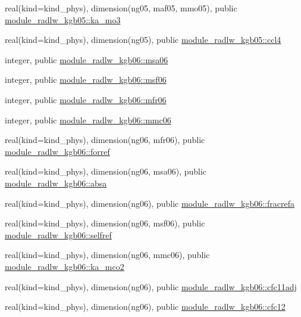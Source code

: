 \begin{DoxyCompactItemize}
\item 
real(kind=kind\+\_\+phys), dimension(ng05, maf05, mmo05), public \hyperlink{namespacemodule__radlw__kgb05_a6021fc2f60379615b7882a28e1caa1e9}{module\+\_\+radlw\+\_\+kgb05\+::ka\+\_\+mo3}
\item 
real(kind=kind\+\_\+phys), dimension(ng05), public \hyperlink{namespacemodule__radlw__kgb05_a15c6b3bfa9d8cbf20099dd4f364444b5}{module\+\_\+radlw\+\_\+kgb05\+::ccl4}
\item 
integer, public \hyperlink{namespacemodule__radlw__kgb06_add7b5d0d3ea44e1e677948c33e870333}{module\+\_\+radlw\+\_\+kgb06\+::msa06}
\item 
integer, public \hyperlink{namespacemodule__radlw__kgb06_a65f808aeb87457d383dd7f9366878fb9}{module\+\_\+radlw\+\_\+kgb06\+::msf06}
\item 
integer, public \hyperlink{namespacemodule__radlw__kgb06_aaf1f13cdb5c2888b416a91e8b17e41d8}{module\+\_\+radlw\+\_\+kgb06\+::mfr06}
\item 
integer, public \hyperlink{namespacemodule__radlw__kgb06_af7a377cb66fd48348789c20f5a31dec6}{module\+\_\+radlw\+\_\+kgb06\+::mmc06}
\item 
real(kind=kind\+\_\+phys), dimension(ng06, mfr06), public \hyperlink{namespacemodule__radlw__kgb06_a6a0467b666bc75f90ae58fa4f58f07f0}{module\+\_\+radlw\+\_\+kgb06\+::forref}
\item 
real(kind=kind\+\_\+phys), dimension(ng06, msa06), public \hyperlink{namespacemodule__radlw__kgb06_a21bd40309855c89a64b88be171bfde59}{module\+\_\+radlw\+\_\+kgb06\+::absa}
\item 
real(kind=kind\+\_\+phys), dimension(ng06), public \hyperlink{namespacemodule__radlw__kgb06_a1354ecbc5f07cd763847333e680c686a}{module\+\_\+radlw\+\_\+kgb06\+::fracrefa}
\item 
real(kind=kind\+\_\+phys), dimension(ng06, msf06), public \hyperlink{namespacemodule__radlw__kgb06_a98901725947a4477924a47af5e67277e}{module\+\_\+radlw\+\_\+kgb06\+::selfref}
\item 
real(kind=kind\+\_\+phys), dimension(ng06, mmc06), public \hyperlink{namespacemodule__radlw__kgb06_adb5dab732383b82e89f1048ab5150c23}{module\+\_\+radlw\+\_\+kgb06\+::ka\+\_\+mco2}
\item 
real(kind=kind\+\_\+phys), dimension(ng06), public \hyperlink{namespacemodule__radlw__kgb06_a8b0813723ba69b1afbe2552f6b730267}{module\+\_\+radlw\+\_\+kgb06\+::cfc11adj}
\item 
real(kind=kind\+\_\+phys), dimension(ng06), public \hyperlink{namespacemodule__radlw__kgb06_a44f5934520edc537b5df004774b0ef71}{module\+\_\+radlw\+\_\+kgb06\+::cfc12}

\end{DoxyCompactItemize}
